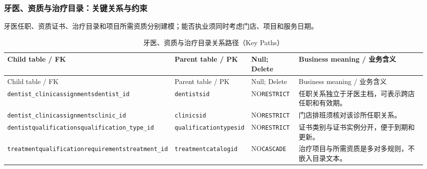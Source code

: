 \subsubsection{牙医、资质与治疗目录：关键关系与约束}
牙医任职、资质证书、治疗目录和项目所需资质分别建模；能否执业须同时考虑门店、项目和服务日期。

\begingroup\footnotesize\setlength{\tabcolsep}{3pt}
\begin{longtable}{@{}L{43mm}L{32mm}L{24mm}L{49mm}@{}}
\caption{牙医、资质与治疗目录关系路径（Key Paths）}\label{tab:domain-key-04}\\\toprule
Child table / FK & Parent table / PK & Null; Delete & Business meaning / 业务含义\\\midrule\endfirsthead
\toprule Child table / FK & Parent table / PK & Null; Delete & Business meaning / 业务含义\\\midrule\endhead
\texttt{dentist\_clinic}\newline\texttt{assignments}\newline\texttt{dentist\_id} & \texttt{dentists}\newline\texttt{id} & NO\newline\texttt{RESTRICT} & 任职关系独立于牙医主档，可表示跨店任职和有效期。\\
\texttt{dentist\_clinic}\newline\texttt{assignments}\newline\texttt{clinic\_id} & \texttt{clinics}\newline\texttt{id} & NO\newline\texttt{RESTRICT} & 门店排班须核对该诊所任职关系。\\
\texttt{dentist}\newline\texttt{qualifications}\newline\texttt{qualification\_type\_id} & \texttt{qualification}\newline\texttt{types}\newline\texttt{id} & NO\newline\texttt{RESTRICT} & 证书类别与证书实例分开，便于到期和更新。\\
\texttt{treatment}\newline\texttt{qualification}\newline\texttt{requirements}\newline\texttt{treatment\_id} & \texttt{treatment}\newline\texttt{catalog}\newline\texttt{id} & NO\newline\texttt{CASCADE} & 治疗项目与所需资质是多对多规则，不嵌入目录文本。\\

\end{longtable}
